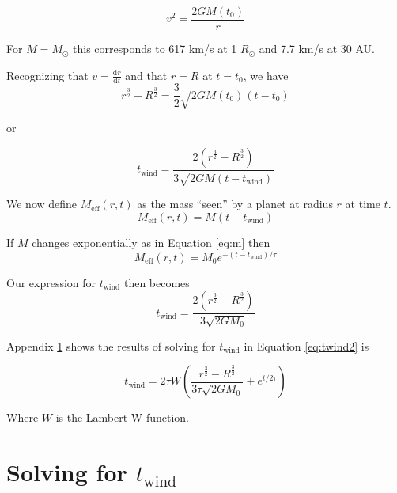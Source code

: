 \documentclass[twocolumn]{aastex631}
\begin{document}
\begin{equation}
    v^2 = \frac{2 G M(t_0)}{r}
\end{equation}

For $M=M_\odot$ this corresponds to 617 km/s at 1 $R_\odot$
and 7.7 km/s at 30 AU.

Recognizing that $v = \frac{\text{d}r}{\text{d}t}$ and that
$r=R$ at $t=t_0$, we have
\begin{equation}
    r^{\frac{3}{2}} - R^{\frac{3}{2}} = \frac{3}{2}
    \sqrt{2 G M(t_0)} (t-t_0)
\end{equation}

or

\begin{equation}
    t_{\text{wind}} = \frac{2 ( r^{\frac{3}{2}} - R^{\frac{3}{2}} )}
    {3\sqrt{2 G M(t - t_{\text{wind}})}} \label{eq:twind}
\end{equation}

We now define $M_{\text{eff}}(r,t)$ as the mass ``seen'' by a planet at
radius $r$ at time $t$.
\begin{equation}
    M_{\text{eff}}(r,t) = M(t-t_{\text{wind}}) \label{eq:meff}
\end{equation}

If $M$ changes exponentially as in Equation \ref{eq:m} then
\begin{equation}
    M_{\text{eff}}(r,t) = M_0 e^{-(t-t_{\text{wind}})/\tau} \label{eq:meff2}
\end{equation}

Our expression for $t_{\text{wind}}$ then becomes
\begin{equation}
    t_{\text{wind}} = \frac{2 ( r^{\frac{3}{2}} - R^{\frac{3}{2}} )}
    {3\sqrt{2 G M_0 }} \label{eq:twind2}
\end{equation}

Appendix \ref{app:twind} shows the results of solving for
$t_{\text{wind}}$ in Equation \ref{eq:twind2} is

\begin{equation}
    t_{\text{wind}} = 2\tau
    W\left(
        \frac{r^{\frac{3}{2}} - R^{\frac{3}{2}}}
        {3\tau\sqrt{2 G M_0}}
        + e^{t/2\tau}
    \right)
    \label{eq:twindfinal}
\end{equation}

Where $W$ is the Lambert W function.



\appendix

\section{Solving for $t_{\text{wind}}$}
\label{app:twind}
\end{document}
